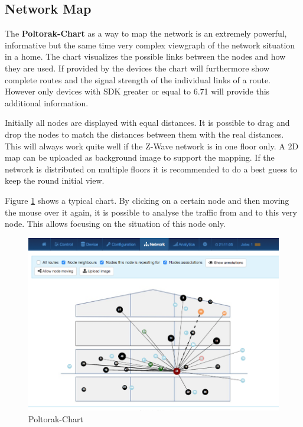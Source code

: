 \subsection{Network Map}

The \textbf{Poltorak-Chart} as a way to map the network is an extremely powerful, informative but the same time very complex
viewgraph of the network situation in a home.  The chart visualizes the possible links between
the nodes and how they are used. If provided by the devices the chart will furthermore show
complete routes and the signal strength of the individual links of a route. However only 
devices with SDK greater or equal to 6.71 will provide this additional information.
 
Initially all nodes are displayed with equal distances. It is possible to drag and drop
the nodes to match the distances between them with the real distances. This will always 
work quite well if the Z-Wave network is in one floor only. 
A 2D map can be uploaded as background image to support the mapping.
If the network is distributed  on multiple floors it is recommended to do a best guess 
to keep the round initial view.

Figure \ref{c5:poltos} shows a typical chart. By clicking on a certain node and then 
moving the mouse over it again, it is possible to analyse the traffic from and to this 
very node. This allows focusing on the situation of this node only.

\begin{figure}
\begin{center}
\includegraphics[width=1.0\textwidth]{pngs/cap7/eui24.png}
\caption {Poltorak-Chart}
\label{c5:poltos}
\end{center}
\end{figure}

